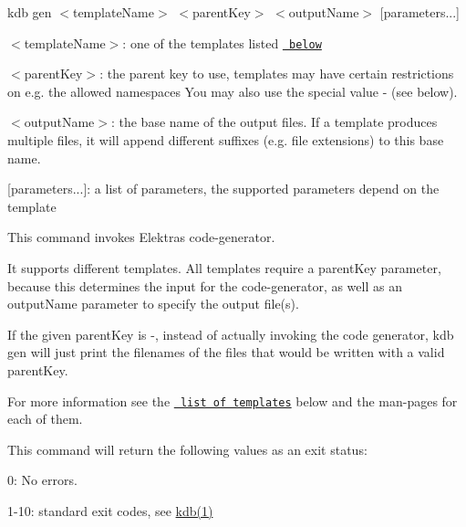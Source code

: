 {\ttfamily kdb gen $<$template\+Name$>$ $<$parent\+Key$>$ $<$output\+Name$>$ \mbox{[}parameters...\mbox{]}}


\begin{DoxyItemize}
\item {\ttfamily $<$template\+Name$>$}\+: one of the templates listed \href{\#templates}{\texttt{ below}}
\item {\ttfamily $<$parent\+Key$>$}\+: the parent key to use, templates may have certain restrictions on e.\+g. the allowed namespaces You may also use the special value {\ttfamily -\/} (see below).
\item {\ttfamily $<$output\+Name$>$}\+: the base name of the output files. If a template produces multiple files, it will append different suffixes (e.\+g. file extensions) to this base name.
\item {\ttfamily \mbox{[}parameters...\mbox{]}}\+: a list of parameters, the supported parameters depend on the template
\end{DoxyItemize}

This command invokes Elektra\textquotesingle{}s code-\/generator.

It supports different templates. All templates require a {\ttfamily parent\+Key} parameter, because this determines the input for the code-\/generator, as well as an {\ttfamily output\+Name} parameter to specify the output file(s).

If the given {\ttfamily parent\+Key} is {\ttfamily -\/}, instead of actually invoking the code generator, {\ttfamily kdb gen} will just print the filenames of the files that would be written with a valid {\ttfamily parent\+Key}.

For more information see the \href{\#templates}{\texttt{ list of templates}} below and the man-\/pages for each of them.

This command will return the following values as an exit status\+:


\begin{DoxyItemize}
\item 0\+: No errors.
\item 1-\/10\+: standard exit codes, see \mbox{\hyperlink{doc_help_kdb_md}{kdb(1)}}
\end{DoxyItemize}


